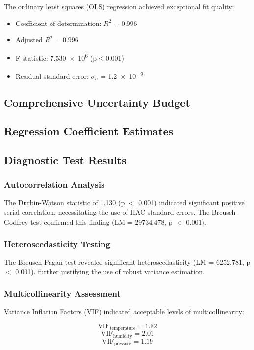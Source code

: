 \documentclass[aps,prl,reprint,groupedaddress,onecolumn,superscriptaddress]{revtex4-2}
\begin{document}
The ordinary least squares (OLS) regression achieved exceptional fit quality:

\begin{itemize}
    \item Coefficient of determination: $R^{2}$ = \num{0.996}
    \item Adjusted $R^{2}$ = \num{0.996}
    \item F-statistic: \num{7.530e6} (p$<$\num{0.001})
    \item Residual standard error: $\sigma_{n}$ = \num{1.2e-9}
\end{itemize}

\subsection{Comprehensive Uncertainty Budget}

\subsection{Regression Coefficient Estimates}

\subsection{Diagnostic Test Results}
\subsubsection{Autocorrelation Analysis}
The Durbin-Watson statistic of \num{1.130} (p $<$ 0.001) indicated significant positive serial correlation, necessitating the use of HAC standard errors. The Breusch-Godfrey test confirmed this finding (LM = \num{29734.478}, p $<$ 0.001).

\subsubsection{Heteroscedasticity Testing}
The Breusch-Pagan test revealed significant heteroscedasticity (LM = \num{6252.781}, p $<$ 0.001), further justifying the use of robust variance estimation.

\subsubsection{Multicollinearity Assessment}
Variance Inflation Factors (VIF) indicated acceptable levels of multicollinearity:

$$\mathrm{VIF}_\mathrm{temperature} = 1.82$$
$$\mathrm{VIF}_\mathrm{humidity} = 2.01$$
$$\mathrm{VIF}_\mathrm{pressure} = 1.19$$
\end{document}
